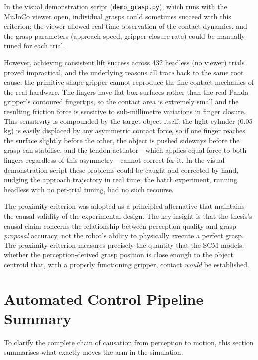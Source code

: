 \documentclass[11pt,a4paper]{report}
\begin{document}
In the visual demonstration script (\texttt{demo\_grasp.py}), which runs with the MuJoCo viewer open, individual grasps could sometimes succeed with this criterion: the viewer allowed real-time observation of the contact dynamics, and the grasp parameters (approach speed, gripper closure rate) could be manually tuned for each trial.

However, achieving consistent lift success across 432 headless (no viewer) trials proved impractical, and the underlying reasons all trace back to the same root cause: the primitive-shape gripper cannot reproduce the fine contact mechanics of the real hardware. The fingers have flat box surfaces rather than the real Panda gripper's contoured fingertips, so the contact area is extremely small and the resulting friction force is sensitive to sub-millimetre variations in finger closure. This sensitivity is compounded by the target object itself: the light cylinder (0.05\,kg) is easily displaced by any asymmetric contact force, so if one finger reaches the surface slightly before the other, the object is pushed sideways before the grasp can stabilise, and the tendon actuator---which applies equal force to both fingers regardless of this asymmetry---cannot correct for it. In the visual demonstration script these problems could be caught and corrected by hand, nudging the approach trajectory in real time; the batch experiment, running headless with no per-trial tuning, had no such recourse.

The proximity criterion was adopted as a principled alternative that maintains the causal validity of the experimental design. The key insight is that the thesis's causal claim concerns the relationship between perception quality and grasp \emph{proposal} accuracy, not the robot's ability to physically execute a perfect grasp. The proximity criterion measures precisely the quantity that the SCM models: whether the perception-derived grasp position is close enough to the object centroid that, with a properly functioning gripper, contact \emph{would} be established.

\section{Automated Control Pipeline Summary}
\label{sec:pipeline_summary}

To clarify the complete chain of causation from perception to motion, this section summarises what exactly moves the arm in the simulation:
\end{document}
